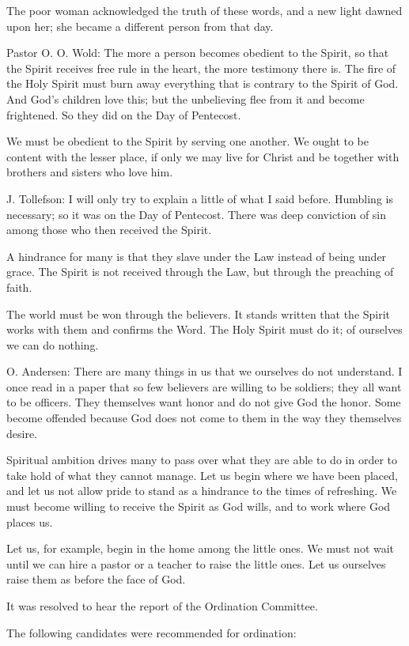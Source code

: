 The poor woman acknowledged the truth of these words, and a new light dawned upon her; she became a different person from that day.

Pastor O. O. Wold: The more a person becomes obedient to the Spirit, so that the Spirit receives free rule in the heart, the more testimony there is. The fire of the Holy Spirit must burn away everything that is contrary to the Spirit of God. And God’s children love this; but the unbelieving flee from it and become frightened. So they did on the Day of Pentecost.

We must be obedient to the Spirit by serving one another. We ought to be content with the lesser place, if only we may live for Christ and be together with brothers and sisters who love him.

J. Tollefson: I will only try to explain a little of what I said before. Humbling is necessary; so it was on the Day of Pentecost. There was deep conviction of sin among those who then received the Spirit.

A hindrance for many is that they slave under the Law instead of being under grace. The Spirit is not received through the Law, but through the preaching of faith.

The world must be won through the believers. It stands written that the Spirit works with them and confirms the Word. The Holy Spirit must do it; of ourselves we can do nothing.

O. Andersen: There are many things in us that we ourselves do not understand. I once read in a paper that so few believers are willing to be soldiers; they all want to be officers. They themselves want honor and do not give God the honor. Some become offended because God does not come to them in the way they themselves desire.

Spiritual ambition drives many to pass over what they are able to do in order to take hold of what they cannot manage. Let us begin where we have been placed, and let us not allow pride to stand as a hindrance to the times of refreshing. We must become willing to receive the Spirit as God wills, and to work where God places us.

Let us, for example, begin in the home among the little ones. We must not wait until we can hire a pastor or a teacher to raise the little ones. Let us ourselves raise them as before the face of God.

It was resolved to hear the report of the Ordination Committee.

The following candidates were recommended for ordination:

